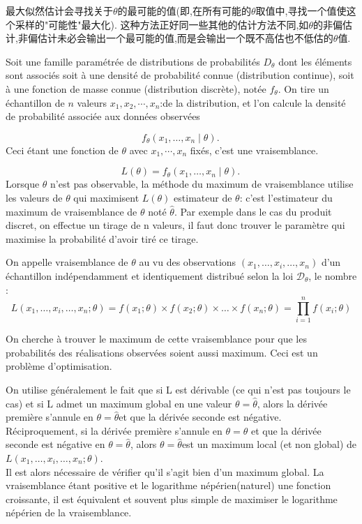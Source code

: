 \documentclass{article}
\begin{document}
最大似然估计会寻找关于$\theta$的最可能的值(即,在所有可能的$\theta$取值中,寻找一个值使这个采样的"可能性"最大化).
这种方法正好同一些其他的估计方法不同,如$\theta$的非偏估计,非偏估计未必会输出一个最可能的值,而是会输出一个既不高估也不低估的$\theta$值.

Soit une famille param\'etr\'ee de distributions de probabilit\'es $D_{\theta}$ dont les \'el\'ements sont associ\'es soit
\`a une densit\'e de probabilit\'e connue (distribution continue), soit \`a une fonction de masse connue (distribution discr\`ete), not\'ee $f_{\theta}$.
On tire un \'echantillon de $n$ valeurs $x_1, x_2, \cdots, x_n$:de la distribution,
et l'on calcule la densit\'e de probabilit\'e associ\'ee aux donn\'ees observ\'ees

$$ f_\theta(x_1,\dots,x_n \mid \theta).\, $$
Ceci \'etant une fonction de $\theta$ avec $x_1, \cdots, x_n$ fix\'es, c'est une vraisemblance.

$$ L(\theta) = f_\theta(x_1,\dots,x_n \mid \theta).\, $$
Lorsque $\theta$ n'est pas observable, la m\'ethode du maximum de vraisemblance utilise les valeurs de $\theta$ qui
maximisent $L(\theta)$ estimateur de $\theta$: c'est l'estimateur du maximum de vraisemblance de $\theta$ not\'e $\widehat{\theta}$.
Par exemple dans le cas du produit discret, on effectue un tirage de n valeurs,
il faut donc trouver le param\`etre qui maximise la probabilit\'e d'avoir tir\'e ce tirage.

\bigskip
On appelle vraisemblance de $\theta$ au vu des observations $(x_1, \ldots,x_i, \ldots, x_n)$ d'un \'echantillon ind\'ependamment et identiquement distribu\'e
selon la loi $\mathcal{D}_\theta$, le nombre :
$$ L(x_1, \ldots,x_i, \ldots,x_n;\theta) = f(x_1;\theta) \times f(x_2;\theta) \times \ldots \times f(x_n;\theta) = \prod_{i=1}^n f(x_i;\theta) $$

On cherche à trouver le maximum de cette vraisemblance pour que les probabilit\'es des r\'ealisations observ\'ees soient aussi maximum.
Ceci est un probl\`eme d'optimisation.

On utilise g\'en\'eralement le fait que si L est d\'erivable (ce qui n'est pas toujours le cas) et
si L admet un maximum global en une valeur $\theta = \hat \theta$,
alors la d\'eriv\'ee premi\`ere s'annule en $\theta = \hat \theta $et que la d\'eriv\'ee seconde est n\'egative. \\
R\'eciproquement, si la d\'eriv\'ee premi\`ere s'annule en $\theta = \hat \theta$ et que la d\'eriv\'ee seconde est n\'egative en $\theta = \hat \theta$,
alors $\theta = \hat \theta $est un maximum local (et non global) de $L(x_1, \ldots, x_i, \ldots,x_n;\theta)$. \\
Il est alors n\'ecessaire de v\'erifier qu'il s'agit bien d'un maximum global.
La vraisemblance \'etant positive et le logarithme n\'ep\'erien(naturel) une fonction croissante,
il est \'equivalent et souvent plus simple de maximiser le logarithme n\'ep\'erien de la vraisemblance.
\end{document}
